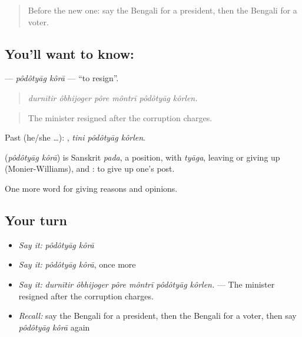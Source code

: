 \label{lesson:BN-C346-podotyag-kora}



\begin{quote}
Before the new one: say the Bengali for a president, then the Bengali for a voter.
\end{quote}

\subsection*{You'll want to know:  }
\textbf{ } — \emph{pôdôtyāg kôrā} — \textquotedblleft{}to resign\textquotedblright{}.

\begin{quote}
     
\end{quote}

\begin{quote}
\emph{durnītir ôbhijoger pôre môntrī pôdôtyāg kôrlen.}
\end{quote}

\begin{quote}
The minister resigned after the corruption charges.
\end{quote}

Past (he/she …):   , \emph{tini pôdôtyāg kôrlen}.

\begin{cousinweb}
\textbf{ } (\emph{pôdôtyāg kôrā}) is Sanskrit \emph{pada}, a position, with \emph{tyāga}, leaving or giving up (Monier-Williams), and : to give up one's post.
\end{cousinweb}

\begin{grammarlens}[title={What you've built}]
One more word for giving reasons and opinions.
\end{grammarlens}

\subsection*{Your turn}
\begin{itemize}
\raggedright
  \item \emph{Say it:} \emph{pôdôtyāg kôrā}
  \item \emph{Say it:} \emph{pôdôtyāg kôrā}, once more
  \item \emph{Say it:} \emph{durnītir ôbhijoger pôre môntrī pôdôtyāg kôrlen.} — The minister resigned after the corruption charges.
  \item \emph{Recall:} say the Bengali for a president, then the Bengali for a voter, then say \emph{pôdôtyāg kôrā} again
\end{itemize}

